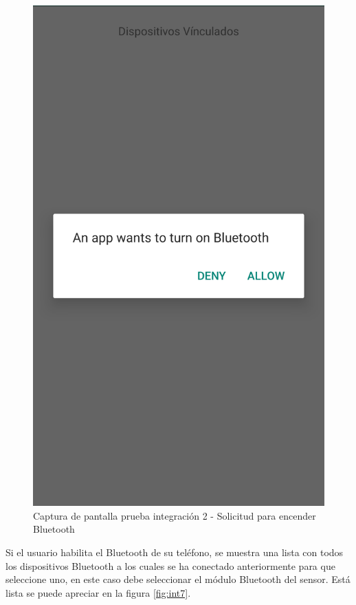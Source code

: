 \begin{figure}[H]
	\centering
	\includegraphics[scale=.2]{Capitulo6/integracion/software/images/6}
	\caption{Captura de pantalla prueba integración 2 - Solicitud para encender Bluetooth}
	\label{fig:int6}
\end{figure}

Si el usuario habilita el Bluetooth de su teléfono, se muestra una lista con todos los dispositivos Bluetooth a los cuales se ha conectado anteriormente para que seleccione uno, en este caso debe seleccionar el módulo Bluetooth del sensor. Está lista se puede apreciar en la figura \ref{fig:int7}.

